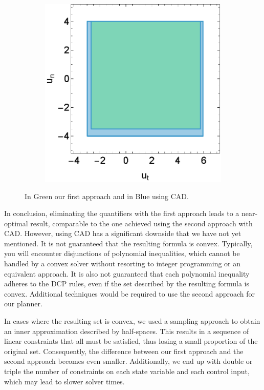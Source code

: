 \begin{figure}[h]
\begin{subfigure}[b]{0.32\textwidth}
	\end{subfigure}
	\begin{subfigure}[b]{0.32\textwidth}
		\centering
		\includegraphics[width=\textwidth]{content/main_paper/region_u1u2_plot_gr1.eps}
	\end{subfigure}

	\caption{In Green our first approach and in Blue using CAD.}
\end{figure}

In conclusion, eliminating the quantifiers with the first approach leads to a near-optimal result, comparable to the one achieved using the second
approach with CAD.
However, using CAD has a significant downside that we have not yet mentioned.
It is not guaranteed that the resulting formula is convex.
Typically, you will encounter disjunctions of polynomial inequalities, which cannot be handled by a convex solver without resorting to integer
programming or an equivalent approach.
It is also not guaranteed that each polynomial inequality adheres to the DCP rules, even if the set described by the resulting formula is convex.
Additional techniques would be required to use the second approach for our planner.

In cases where the resulting set is convex, we used a sampling approach to obtain an inner approximation described by half-spaces.
This results in a sequence of linear constraints that all must be satisfied, thus losing a small proportion of the original set.
Consequently, the difference between our first approach and the second approach becomes even smaller.
Additionally, we end up with double or triple the number of constraints on each state variable and each control input, which may lead to slower
solver times.

